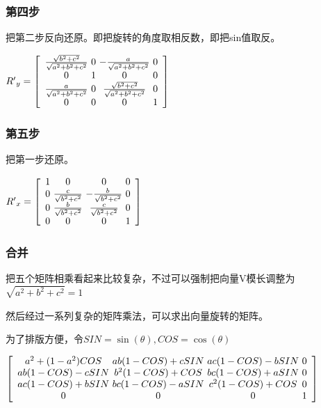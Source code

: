 \begin{frame}
\frametitle{第四步}
\pause
把第二步反向还原。即把旋转的角度取相反数，即把sin值取反。

${R'}_y=
\left[
\begin{array}{ c @{\ } c @{\ } c @{\ } c}
    \frac{ \sqrt{b^2+c^2} }{ \sqrt{a^2+b^2+c^2} } & 0 & -\frac{ a }{ \sqrt{a^2+b^2+c^2} }             & 0 \\
    0                                             & 1 & 0                                             & 0 \\
    \frac{ a }{ \sqrt{a^2+b^2+c^2} }              & 0 & \frac{ \sqrt{b^2+c^2} }{ \sqrt{a^2+b^2+c^2} } & 0 \\
    0                                             & 0 & 0                                             & 1
\end{array}
\right]
$
\end{frame}

\begin{frame}
\frametitle{第五步}
\pause
把第一步还原。

${R'}_x=
\left[
\begin{array}{ c @{\ } c @{\ } c @{\ } c}
    1 & 0                            & 0                             & 0 \\
    0 & \frac{ c }{ \sqrt{b^2+c^2} } & -\frac{ b }{ \sqrt{b^2+c^2} } & 0 \\
    0 & \frac{ b }{ \sqrt{b^2+c^2} } & \frac{ c }{ \sqrt{b^2+c^2} }  & 0 \\
    0 & 0                            & 0                             & 1
\end{array}
\right]
$
\end{frame}

\begin{frame}
\frametitle{合并}
\pause
把五个矩阵相乘看起来比较复杂，不过可以强制把向量V模长调整为$\sqrt{a^2+b^2+c^2}=1$

\pause
然后经过一系列复杂的矩阵乘法，可以求出向量旋转的矩阵。

\pause
为了排版方便，令$SIN=\sin(\theta),COS=\cos(\theta)$

$
\left[
\begin{array}{ c @{\ } c @{\ } c @{\ } c}
    a^2+(1-a^2)COS & ab(1-COS)+cSIN & ac(1-COS)-bSIN & 0 \\
    ab(1-COS)-cSIN & b^2(1-COS)+COS & bc(1-COS)+aSIN & 0 \\
    ac(1-COS)+bSIN & bc(1-COS)-aSIN & c^2(1-COS)+COS & 0 \\
    0              & 0              & 0              & 1
\end{array}
\right]
$
\end{frame}

